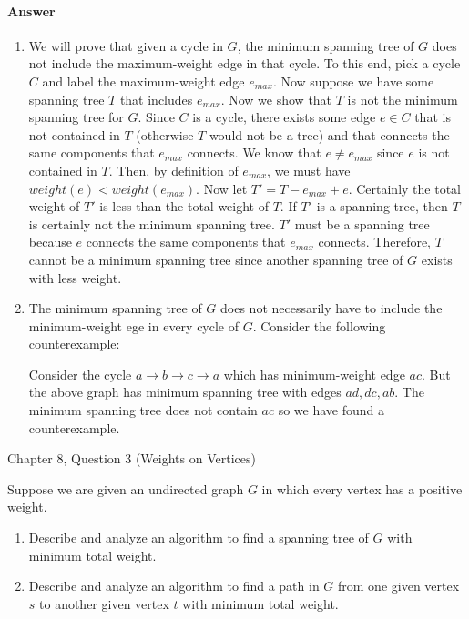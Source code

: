 \documentclass{article}
\begin{document}
\paragraph{Answer}


\begin{enumerate}[label=(\alph*)]
    \item We will prove that given a cycle in $G$, the minimum spanning tree of $G$ does not include the maximum-weight edge in that cycle.
    To this end, pick a cycle $C$ and label the maximum-weight edge $e_{max}$.
    Now suppose we have some spanning tree $T$ that includes $e_{max}$.
    Now we show that $T$ is not the minimum spanning tree for $G$. \parspace
    Since $C$ is a cycle, there exists some edge $e \in C$ that is not contained in $T$ (otherwise $T$ would not be a tree) and that connects the same components that $e_{max}$ connects.
    We know that $e \neq e_{max}$ since $e$ is not contained in $T$.
    Then, by definition of $e_{max}$, we must have $weight(e) < weight(e_{max})$.
    Now let $T' = T - e_{max} + e$.
    Certainly the total weight of $T'$ is less than the total weight of $T$.
    If $T'$ is a spanning tree, then $T$ is certainly not the minimum spanning tree.
    $T'$ must be a spanning tree because $e$ connects the same components that $e_{max}$ connects.
    Therefore, $T$ cannot be a minimum spanning tree since another spanning tree of $G$ exists with less weight.
    \item The minimum spanning tree of $G$ does not necessarily have to include the minimum-weight ege in every cycle of $G$.
    Consider the following counterexample:
    \begin{center}\end{center}
    Consider the cycle $a \to b \to c \to a$ which has minimum-weight edge $ac$.
    But the above graph has minimum spanning tree with edges $ad, dc, ab$.
    The minimum spanning tree does not contain $ac$ so we have found a counterexample.
\end{enumerate}



\nextprob
{}

Chapter 8, Question 3 (Weights on Vertices)

Suppose we are given an undirected graph $G$ in which every vertex has a positive weight.
\begin{enumerate}[label=(\alph*)]
    \item Describe and analyze an algorithm to find a spanning tree of $G$ with minimum total weight.
    \item Describe and analyze an algorithm to find a path in $G$ from one given vertex $s$ to another given vertex $t$ with minimum total weight.
\end{enumerate}
\end{document}
